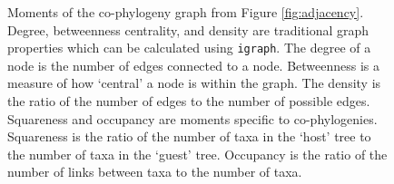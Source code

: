 \begin{figure}
\centering
{}
\caption{Moments of the co-phylogeny graph from Figure \ref{fig:adjacency}. Degree, betweenness centrality, and density are traditional graph properties which can be calculated using {\tt igraph}. The degree of a node is the number of edges connected to a node. Betweenness is a measure of how `central' a node is within the graph. The density is the ratio of the number of edges to the number of possible edges. Squareness and occupancy are moments specific to co-phylogenies. Squareness is the ratio of the number of taxa in the `host' tree to the number of taxa in the `guest' tree. Occupancy is the ratio of the number of links between taxa to the number of taxa.  } 
\label{fig:graph_moments}
\end{figure}
